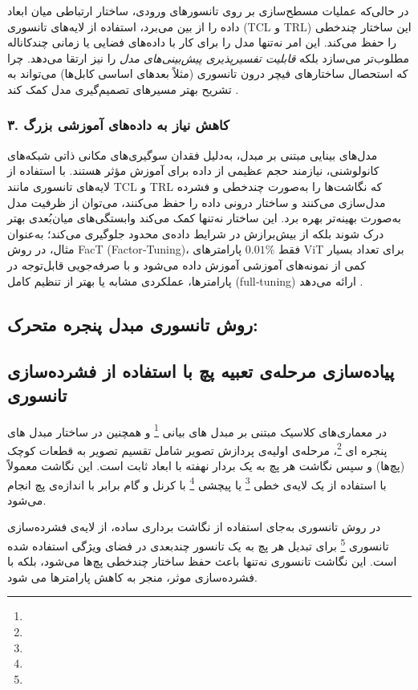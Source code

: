 در حالی‌که عملیات مسطح‌سازی بر روی تانسورهای ورودی، ساختار ارتباطی میان ابعاد داده را از بین می‌برد، استفاده از لایه‌های تانسوری (TCL و TRL) این ساختار چندخطی را حفظ می‌کند. این امر نه‌تنها مدل را برای کار با داده‌های فضایی یا زمانی چندکاناله مطلوب‌تر می‌سازد بلکه \emph{قابلیت تفسیرپذیری پیش‌بینی‌های مدل} را نیز ارتقا می‌دهد. چرا که استحصال ساختارهای فیچر درون تانسوری (مثلاً بعدهای اساسی کابل‌ها) می‌تواند به تشریح بهتر مسیرهای تصمیم‌گیری مدل کمک کند \cite{hamreras2025tensorization}.

\subsubsection{۳. \textbf{کاهش نیاز به داده‌های آموزشی بزرگ}}

مدل‌های بینایی مبتنی بر مبدل، به‌دلیل فقدان سوگیری‌های مکانی ذاتی شبکه‌های کانولوشنی، نیازمند حجم عظیمی از داده برای آموزش مؤثر هستند. با استفاده از لایه‌های تانسوری مانند TCL و TRL که نگاشت‌ها را به‌صورت چندخطی و فشرده مدل‌سازی می‌کنند و ساختار درونی داده را حفظ می‌کنند، می‌توان از ظرفیت مدل به‌صورت بهینه‌تر بهره برد. این ساختار نه‌تنها کمک می‌کند وابستگی‌های میان‌بُعدی بهتر درک شوند بلکه از بیش‌برازش در شرایط داده‌ی محدود جلوگیری می‌کند؛ به‌عنوان مثال، در روش FacT (Factor‑Tuning)، فقط \(0.01\%\) پارامترهای ViT برای تعداد بسیار کمی از نمونه‌های آموزشی آموزش داده می‌شود و با صرفه‌جویی قابل‌توجه در پارامترها، عملکردی مشابه یا بهتر از تنظیم کامل (full‑tuning) ارائه می‌دهد \cite{jie2022fact}.


\subsection{روش تانسوری مبدل پنجره متحرک:}




\subsection{پیاده‌سازی مرحله‌ی  تعبیه پچ
	با استفاده از فشرده‌سازی تانسوری}

در معماری‌های کلاسیک مبتنی بر مبدل های بیانی \footnote{}  و همچنین در ساختار مبدل های پنجره ای \footnote{}، مرحله‌ی اولیه‌ی پردازش تصویر شامل تقسیم تصویر به قطعات کوچک (پچ‌ها) و سپس نگاشت هر پچ به یک بردار نهفته با ابعاد ثابت است. این نگاشت معمولاً با استفاده از یک لایه‌ی خطی \footnote{} یا پیچشی \footnote{} با کرنل و گام برابر با اندازه‌ی پچ انجام می‌شود.

در روش تانسوری به‌جای استفاده از نگاشت برداری ساده، از لایه‌ی فشرده‌سازی تانسوری \footnote{} برای تبدیل هر پچ به یک تانسور چندبعدی در فضای ویژگی استفاده شده است. این نگاشت تانسوری نه‌تنها باعث حفظ ساختار چندخطی پچ‌ها می‌شود، بلکه با فشرده‌سازی موثر، منجر به کاهش پارامترها می شود.




